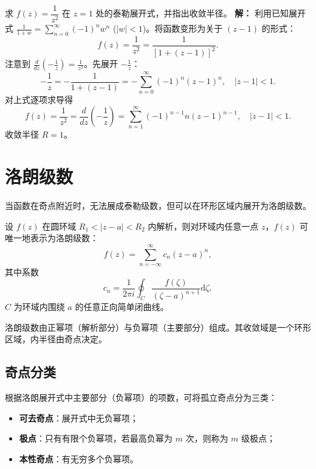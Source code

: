 \begin{tcolorbox}[title=例 2, colframe=orange!75!black, colback=orange!5!white, sharp corners]
	求 $f(z)=\dfrac{1}{z^2}$ 在 $z=1$ 处的泰勒展开式，并指出收敛半径。
	\tcbline
	\textbf{解：} 利用已知展开式 $\frac{1}{1+w} = \sum_{n=0}^{\infty} (-1)^n w^n$ ($|w|<1$)。将函数变形为关于 $(z-1)$ 的形式：
	\[
	f(z) = \frac{1}{z^2} = \frac{1}{[1+(z-1)]^2}.
	\]
	注意到 $\frac{d}{dz}\left(-\frac{1}{z}\right) = \frac{1}{z^2}$。先展开 $-\frac{1}{z}$：
	\[
	-\frac{1}{z} = -\frac{1}{1+(z-1)} = -\sum_{n=0}^{\infty} (-1)^n (z-1)^n, \quad |z-1|<1.
	\]
	对上式逐项求导得
	\[
	f(z) = \frac{1}{z^2} = \frac{d}{dz}\left(-\frac{1}{z}\right) = \sum_{n=1}^{\infty} (-1)^{n-1} n (z-1)^{n-1}, \quad |z-1|<1.
	\]
	收敛半径 $R=1$。
\end{tcolorbox}

\section{洛朗级数}
当函数在奇点附近时，无法展成泰勒级数，但可以在环形区域内展开为洛朗级数。

\begin{tcolorbox}[title=定理：洛朗展开定理, colframe=green!45!black, colback=green!5!white]
	设 $f(z)$ 在圆环域 $R_1 < |z-a| < R_2$ 内解析，则对环域内任意一点 $z$，$f(z)$ 可唯一地表示为洛朗级数：
	\[
	f(z) = \sum_{n=-\infty}^{\infty} c_n (z-a)^n,
	\]
	其中系数
	\[
	c_n = \frac{1}{2\pi i} \oint_C \frac{f(\zeta)}{(\zeta-a)^{n+1}} \mathrm{d}\zeta,
	\]
	$C$ 为环域内围绕 $a$ 的任意正向简单闭曲线。
\end{tcolorbox}

洛朗级数由正幂项（解析部分）与负幂项（主要部分）组成。其收敛域是一个环形区域，内半径由奇点决定。

\subsection{奇点分类}
根据洛朗展开式中主要部分（负幂项）的项数，可将孤立奇点分为三类：
\begin{itemize}
	\item \textbf{可去奇点}：展开式中无负幂项；
	\item \textbf{极点}：只有有限个负幂项，若最高负幂为 $m$ 次，则称为 $m$ 级极点；
	\item \textbf{本性奇点}：有无穷多个负幂项。
\end{itemize}

